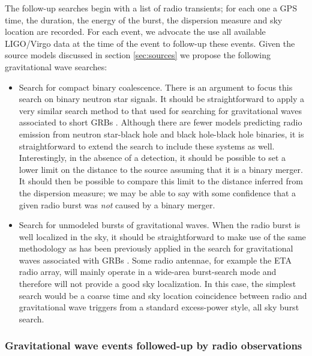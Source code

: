 \documentclass[epsf]{article}
\begin{document}
The follow-up searches begin with a list of radio transients; for each
one a GPS time, the duration, the energy of the burst, the dispersion
measure and sky location are recorded. For each event, we advocate the use all available
LIGO/Virgo data at the time of the event to follow-up these events.
Given the source models discussed in section \ref{sec:sources} we
propose the following gravitational wave searches:

\begin{itemize}

\item Search for compact binary coalescence.  There is an argument to
focus this search on binary neutron star signals.  It should be straightforward to apply
a very similar search method to that used for searching for
gravitational waves associated to short GRBs \cite{Abbott:2007rh}.  Although
there are fewer models predicting radio emission from neutron star-black
hole and black hole-black hole binaries, it is straightforward to extend
the search to include these systems as well.  Interestingly, in the absence of a
detection, it should be possible to set a lower limit on the distance to
the source assuming that it is a binary merger. It should then be
possible to compare this limit to the distance inferred from the
dispersion measure; we may be able to say with some confidence that a given
radio burst was {\em not} caused by a binary merger.

\item Search for unmodeled bursts of gravitational waves.  When the radio
burst is well localized in the sky, it should be straightforward to make
use of the same methodology as has been previously applied in the search
for gravitational waves associated with GRBs \cite{Collaboration:2009kk}.  Some
radio antennae, for example the ETA radio array, will mainly operate in
a wide-area burst-search mode and therefore will not provide a good sky
localization.  In this case, the simplest search would be a coarse time
and sky location coincidence between radio and gravitational wave
triggers from a standard excess-power style, all sky burst search.

\end{itemize}

\subsubsection{Gravitational wave events followed-up by radio observations}
\end{document}

